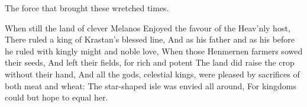 \documentclass[a4paper,12pt]{article}
\newcommand{\vel}{\verseline}
\begin{document}
\begin{poem}
\begin{stanza}
The force that brought these wretched times.
\end{stanza}
\begin{stanza}
When still the land of clever Melanos\vel
Enjoyed the favour of the Heav'nly host,\vel
There ruled a king of Krastan's blessed line,\vel
And as his father and as his before\vel
he ruled with kingly might and noble love,\vel
When those Henmernen farmers sowed their seeds,\vel
And left their fields, for rich and potent\vel
The land did raise the crop without their hand,\vel
And all the gods, celestial kings, were pleased\vel
by sacrifices of both meat and wheat:\vel
The star-shaped isle was envied all around,\vel
For kingdoms could but hope to equal her. 
\end{stanza}
\end{poem}
\end{document}
